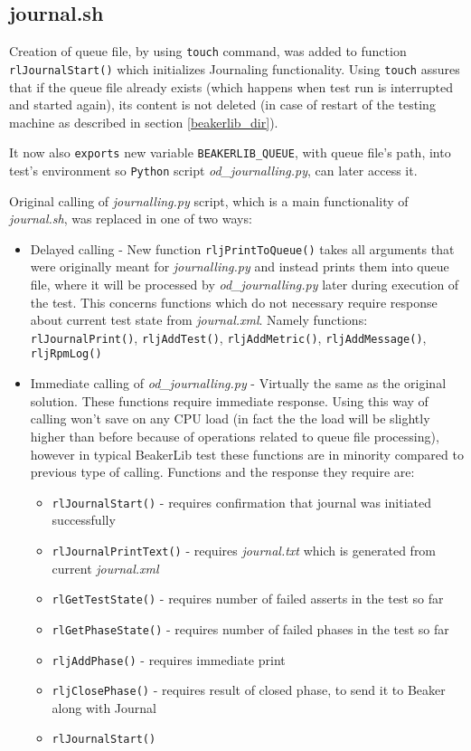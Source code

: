 \subsection{journal.sh}
Creation of  queue file, by using \texttt{touch} command, was added to function \texttt{rlJournalStart()} which initializes Journaling functionality. Using \texttt{touch} assures that if the queue file already exists (which happens when test run is interrupted and started again), its content is not deleted (in case of restart of the testing machine as described in section \ref{beakerlib_dir}).

It now also \texttt{exports} new variable \texttt{BEAKERLIB\_QUEUE}, with queue file's path, into test's environment so \texttt{Python} script \textit{od\_journalling.py}, can later access it.

Original calling of \textit{journalling.py} script, which is a main functionality of \textit{journal.sh}, was replaced in one of two ways:

\begin{itemize}
\item Delayed calling - New function \texttt{rljPrintToQueue()} takes all arguments that were originally meant for \textit{journalling.py} and instead prints them into queue file, where it will be processed by \textit{od\_journalling.py} later during execution of the test. This concerns functions which do not necessary require response about current test state from \textit{journal.xml}.  Namely functions: \texttt{rlJournalPrint()}, \texttt{rljAddTest()}, \texttt{rljAddMetric()}, \texttt{rljAddMessage()}, \texttt{rljRpmLog()}
\item Immediate calling of \textit{od\_journalling.py} - Virtually the same as the original solution. These functions require immediate response. Using this way of calling won't save on any CPU load (in fact the the load will be slightly higher than before because of operations related to queue file processing), however in typical BeakerLib test these functions are in minority compared to previous type of calling.  Functions and the response they require are:  
\begin{itemize}
\item \texttt{rlJournalStart()} - requires confirmation that journal was initiated successfully
\item \texttt{rlJournalPrintText()} - requires \textit{journal.txt} which is generated from current \mbox{\textit{journal.xml}}
\item \texttt{rlGetTestState()}  - requires number of failed asserts in the test so far
\item \texttt{rlGetPhaseState()} - requires number of failed phases in the test so far
\item \texttt{rljAddPhase()} - requires immediate print
\item \texttt{rljClosePhase()} - requires result of closed phase, to send it to Beaker along with Journal
\item \texttt{rlJournalStart()}
\end{itemize}
\end{itemize}

